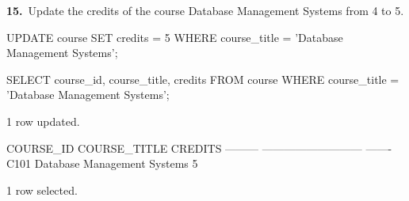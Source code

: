 \noindent\begin{minipage}{\linewidth}
\begingroup{}
{\fontsize{14}{17}\selectfont\textbf{15.}}\ Update the credits of the course Database Management Systems from 4 to 5.\par
\endgroup\vspace{12pt}


\begin{sqlcode}[fontsize=\footnotesize]
UPDATE course SET credits = 5
WHERE course_title = 'Database Management Systems';

SELECT course_id, course_title, credits FROM course
WHERE course_title = 'Database Management Systems';
\end{sqlcode}

\vspace{18pt}


\begin{sqlout}[fontsize=\small]
1 row updated.

COURSE_ID  COURSE_TITLE                 CREDITS
---------  ---------------------------  -------
C101       Database Management Systems        5

1 row selected.
\end{sqlout}
\end{minipage}\par\vspace{24pt}

